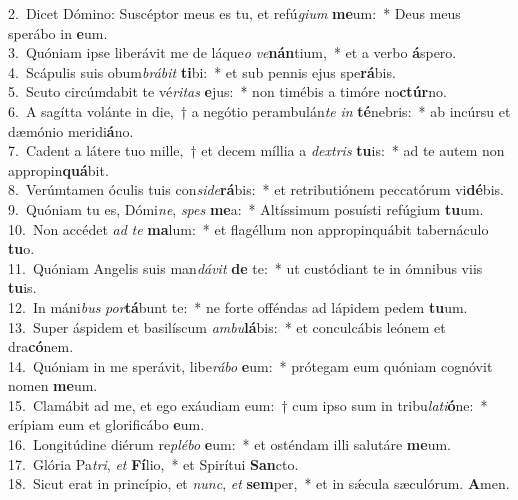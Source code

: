 {2.~}Dicet Dómino: Suscéptor meus es tu, et refú\textit{gi}\textit{um} \textbf{me}um:~* Deus meus sperábo in \textbf{e}um.\\
{3.~}Quóniam ipse liberávit me de láque\textit{o} \textit{ve}\textbf{nán}tium,~* et a verbo \textbf{á}spero.\\
{4.~}Scápulis suis obum\textit{brá}\textit{bit} \textbf{ti}bi:~* et sub pennis ejus spe\textbf{rá}bis.\\
{5.~}Scuto circúmdabit te vé\textit{ri}\textit{tas} \textbf{e}jus:~* non timébis a timóre no\textbf{ctúr}no.\\
{6.~}A sagítta volánte in die,~† a negótio perambulán\textit{te} \textit{in} \textbf{té}nebris:~* ab incúrsu et dæmónio meridi\textbf{á}no.\\
{7.~}Cadent a látere tuo mille,~† et decem míllia a \textit{dex}\textit{tris} \textbf{tu}is:~* ad te autem non appropin\textbf{quá}bit.\\
{8.~}Verúmtamen óculis tuis con\textit{si}\textit{de}\textbf{rá}bis:~* et retributiónem peccatórum vi\textbf{dé}bis.\\
{9.~}Quóniam tu es, Dómi\textit{ne}, \textit{spes} \textbf{me}a:~* Altíssimum posuísti refúgium \textbf{tu}um.\\
{10.~}Non accédet \textit{ad} \textit{te} \textbf{ma}lum:~* et flagéllum non appropinquábit tabernáculo \textbf{tu}o.\\
{11.~}Quóniam Angelis suis man\textit{dá}\textit{vit} \textbf{de} te:~* ut custódiant te in ómnibus viis \textbf{tu}is.\\
{12.~}In máni\textit{bus} \textit{por}\textbf{tá}bunt te:~* ne forte offéndas ad lápidem pedem \textbf{tu}um.\\
{13.~}Super áspidem et basilíscum \textit{am}\textit{bu}\textbf{lá}bis:~* et conculcábis leónem et dra\textbf{có}nem.\\
{14.~}Quóniam in me sperávit, libe\textit{rá}\textit{bo} \textbf{e}um:~* prótegam eum quóniam cognóvit nomen \textbf{me}um.\\
{15.~}Clamábit ad me, et ego exáudiam eum:~† cum ipso sum in tribu\textit{la}\textit{ti}\textbf{ó}ne:~* erípiam eum et glorificábo \textbf{e}um.\\
{16.~}Longitúdine diérum re\textit{plé}\textit{bo} \textbf{e}um:~* et osténdam illi salutáre \textbf{me}um.\\
{17.~}Glória Pa\textit{tri}, \textit{et} \textbf{Fí}lio,~* et Spirítui \textbf{San}cto.\\
{18.~}Sicut erat in princípio, et \textit{nunc}, \textit{et} \textbf{sem}per,~* et in sǽcula sæculórum. \textbf{A}men.\\
